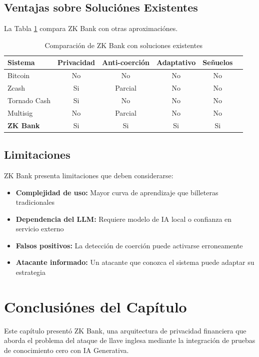 \documentclass[12pt,a4paper,twoside]{book}
\begin{document}
\subsection{Ventajas sobre Soluciónes Existentes}

La Tabla \ref{tab:comparación_soluciones} compara ZK Bank con otras aproximaciónes.

\begin{table}[h]
\centering
\caption{Comparación de ZK Bank con soluciones existentes}
\label{tab:comparación_soluciones}
\begin{tabular}{lccccc}
\toprule
\textbf{Sistema} & \textbf{Privacidad} & \textbf{Anti-coerción} & \textbf{Adaptativo} & \textbf{Señuelos} \\
\midrule
Bitcoin & No & No & No & No \\
Zcash & Si & Parcial & No & No \\
Tornado Cash & Si & No & No & No \\
Multisig & No & Parcial & No & No \\
\textbf{ZK Bank} & Si & Si & Si & Si \\
\bottomrule
\end{tabular}
\end{table}

\subsection{Limitaciones}

ZK Bank presenta limitaciones que deben considerarse:

\begin{itemize}
    \item \textbf{Complejidad de uso:} Mayor curva de aprendizaje que billeteras tradicionales
    \item \textbf{Dependencia del LLM:} Requiere modelo de IA local o confianza en servicio externo
    \item \textbf{Falsos positivos:} La detección de coerción puede activarse erroneamente
    \item \textbf{Atacante informado:} Un atacante que conozca el sistema puede adaptar su estrategia
\end{itemize}

\section{Conclusiónes del Capítulo}

Este capítulo presentó ZK Bank, una arquitectura de privacidad financiera que aborda el problema del ataque de llave inglesa mediante la integración de pruebas de conocimiento cero con IA Generativa.
\end{document}
